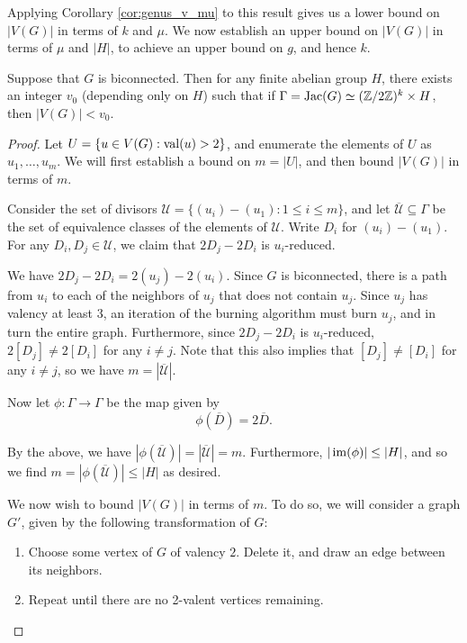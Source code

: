 \documentclass{amsart}
\begin{document}
Applying Corollary \ref{cor:genus_v_mu} to this result gives us a
lower bound on $|V(G)|$ in terms of $k$ and $\mu$. We now establish an
upper bound on $|V(G)|$ in terms of $\mu$ and $|H|$, to achieve an
upper bound on $g$, and hence $k$.

\begin{prop}
  \label{prop:v_bound}
  Suppose that $G$ is biconnected. Then for any finite abelian group
  $H$, there exists an integer $v_0$ (depending only on $H$) such that
  if $\Gamma = \operatorname{Jac}(G) \simeq (\mathbb{Z}/2\mathbb{Z})^k \times H$, then $|V(G)| <
  v_0$.
\end{prop}

\begin{proof}
  Let $U = \{u \in V(G) : \operatorname{val}(u) > 2\}$, and enumerate the elements
  of $U$ as $u_1, \ldots, u_m$. We will first establish a bound on
  $m = |U|$, and then bound $|V(G)|$ in terms of $m$.
  
  Consider the set of divisors $\mathcal{U} = \{(u_i) - (u_1) : 1 \le
  i \le m\}$, and let $\overline{\mathcal{U}} \subseteq \Gamma$ be the
  set of equivalence classes of the elements of $\mathcal{U}$. Write
  $D_i$ for $(u_i) - (u_1)$. For any $D_i, D_j \in \mathcal{U}$, we
  claim that $2D_j - 2D_i$ is $u_i$-reduced.

  We have $2D_j - 2D_i = 2(u_j) - 2(u_i)$. Since $G$ is biconnected,
  there is a path from $u_i$ to each of the neighbors of $u_j$ that
  does not contain $u_j$. Since $u_j$ has valency at least $3$, an
  iteration of the burning algorithm must burn $u_j$, and in turn the
  entire graph. Furthermore, since $2D_j - 2D_i$ is $u_i$-reduced,
  $2[D_j] \ne 2[D_i]$ for any $i \ne j$. Note that this also implies
  that $[D_j] \ne [D_i]$ for any $i \ne j$, so we have
  $m=|\overline{\mathcal{U}}|$.

  Now let $\phi:\Gamma \to \Gamma$ be the map given by
  \[
  \phi(\overline{D}) = 2\overline{D}.
  \] 

  By the above, we have
  $|\phi(\overline{\mathcal{U}})|=|\overline{\mathcal{U}}|=m$. Furthermore,
  $|\operatorname{im}(\phi)| \le |H|$, and so we find
  $m=|\phi(\overline{\mathcal{U}})| \le |H|$ as desired.

  We now wish to bound $|V(G)|$ in terms of $m$. To do so, we will
  consider a graph $G'$, given by the following transformation of $G$:

  \begin{enumerate}
  \item Choose some vertex of $G$ of valency $2$. Delete it, and
    draw an edge between its neighbors.
  \item Repeat until there are no 2-valent vertices remaining.
  \end{enumerate}


\end{proof}
\end{document}
